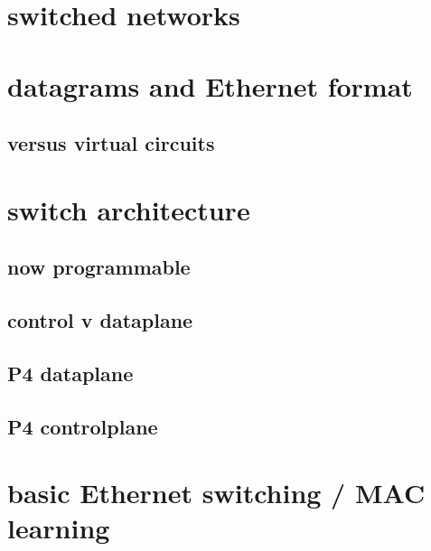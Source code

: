\date{}
\title{}
\date{}

\begin{frame}
    \titlepage
\end{frame}

\section{switched networks}



\section{datagrams and Ethernet format}



\subsection{versus virtual circuits}



\section{switch architecture}

\subsection{now programmable}


\subsection{control v dataplane}


\subsection{P4 dataplane}


\subsection{P4 controlplane}


\section{basic Ethernet switching / MAC learning}

